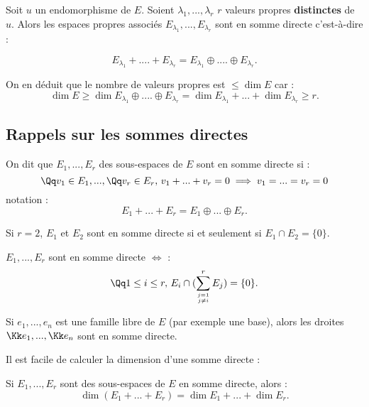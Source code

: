\documentclass[class=report,crop=false]{standalone}
\begin{document}
\begin{theoreme}
Soit $u$ un endomorphisme de $E$. Soient $\lambda_1,...,\lambda_r$ $r$ valeurs propres {\bf distinctes} de $u$. Alors les espaces propres associés $E_{\lambda_1},...,E_{\lambda_r}$ sont en somme directe c'est-à-dire :

\[E_{\lambda_1} + .... + E_{\lambda_r} = E_{\lambda_1} \oplus .... \oplus E_{\lambda_r} .\] 
\end{theoreme}

\begin{remarque*}
On en déduit que le nombre de valeurs propres est $\le \dim E$ car :
\[\dim E \ge \dim E_{\lambda_1} \oplus .... \oplus E_{\lambda_r} = \dim E_{\lambda_1} + ... +  \dim E_{\lambda_r} \ge r .\] 
\end{remarque*}

\subsection*{Rappels sur les sommes directes}

\begin{definition}
On dit que $E_1,...,E_r$ des sous-espaces de $E$ sont en somme directe  si :
\[\Qq v_1 \in E_1,...,\Qq v_r \in E_r,\, v_1+...+v_r = 0 \implies v_1=...=v_r = 0\]
notation :
\[E_1+...+E_r=E_1\oplus...\oplus E_r .\]
\end{definition}

\begin{remarque*}
Si $r = 2$, $E_1$ et $E_2$ sont en somme directe si et seulement si $E_1 \cap E_2 =\{0\}$.
\end{remarque*}

\begin{exercicecours}
$E_1,..., E_r$ sont en somme directe $\iff$ :
\[\Qq 1 \le i \le r,\, E_i \cap (\sum_{j=1\atop j\neq i}^r E_j)=\{0\}.\]
\end{exercicecours}

\begin{exemple}
Si $e_1,...,e_n$ est une famille libre de $E$ (par exemple une base), alors les droites $\Kk e_1,...,\Kk e_n$ sont en somme directe. 
\end{exemple}

Il est facile de calculer la dimension d'une somme directe :

\begin{proposition}
Si $E_1,...,E_r$ sont des sous-espaces de $E$ en somme directe, alors :
\[\dim (E_1 + ...+E_r) = \dim E_1 +...+\dim E_r .\]
\end{proposition}
\end{document}
